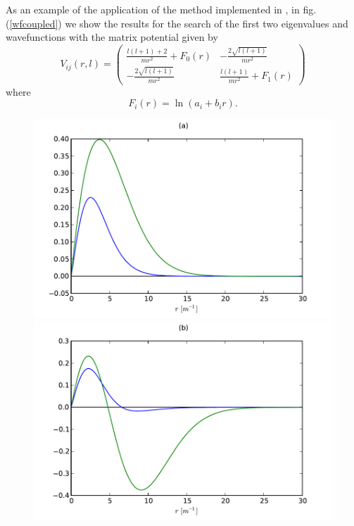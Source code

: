 \documentclass[10pt, a4paper, twocolumn]{article}
\begin{document}
{As an example of the application of the method implemented in \cite{coup-paper}, in fig. (\ref{wfcoupled}) we show the results for the search of the first two eigenvalues and wavefunctions with the matrix potential given by
\begin{equation}\label{matrixpotential}
   V_{ij}(r,l) = \begin{pmatrix} \frac{l(l+1)+2}{mr^2}+F_0(r) & -\frac{2\sqrt{l(l+1)}}{mr^2} \\ -\frac{2\sqrt{l(l+1)}}{mr^2} &  \frac{l(l+1)}{mr^2}+F_1(r) \end{pmatrix}
\end{equation} where 
\begin{equation}
    F_i(r)=\ln(a_i+b_ir).
\end{equation} 
\begin{figure}[htb]
    \centering
\noindent\begin{minipage}[b]{.9\linewidth}
\includegraphics[width=\textwidth]{coupleda.pdf}
\end{minipage}
\vfill
\noindent\begin{minipage}[b]{.9\linewidth}
\includegraphics[width=\textwidth]{coupledb.pdf}

\end{minipage}
\end{figure}}
\end{document}
